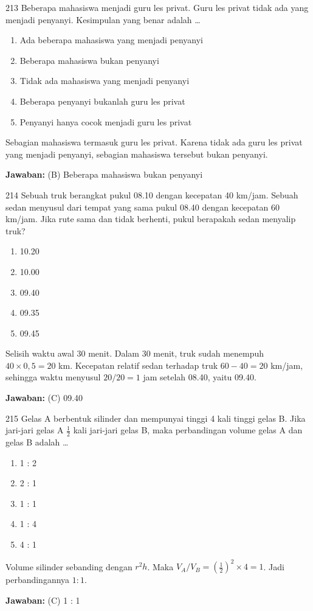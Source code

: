 \documentclass[11pt]{article}
\newenvironment{pil}{\begin{enumerate}[label=(\Alph*),leftmargin=*,itemsep=1pt,topsep=3pt]}{\end{enumerate}}
\newcommand{\jw}[1]{\par\smallskip\begin{jawbox}\textbf{Jawaban:} #1\end{jawbox}}
\begin{document}
\begin{soalbox}{2}{13}
Beberapa mahasiswa menjadi guru les privat. Guru les privat tidak ada yang menjadi penyanyi. Kesimpulan yang benar adalah \ldots
\begin{pil}\item Ada beberapa mahasiswa yang menjadi penyanyi \item Beberapa mahasiswa bukan penyanyi \item Tidak ada mahasiswa yang menjadi penyanyi \item Beberapa penyanyi bukanlah guru les privat \item Penyanyi hanya cocok menjadi guru les privat\end{pil}
\end{soalbox}
\begin{pembox}
Sebagian mahasiswa termasuk guru les privat. Karena tidak ada guru les privat yang menjadi penyanyi, sebagian mahasiswa tersebut bukan penyanyi.
\jw{(B) Beberapa mahasiswa bukan penyanyi}
\end{pembox}

\begin{soalbox}{2}{14}
Sebuah truk berangkat pukul 08.10 dengan kecepatan 40 km/jam. Sebuah sedan menyusul dari tempat yang sama pukul 08.40 dengan kecepatan 60 km/jam. Jika rute sama dan tidak berhenti, pukul berapakah sedan menyalip truk?
\begin{pil}\item 10.20 \item 10.00 \item 09.40 \item 09.35 \item 09.45\end{pil}
\end{soalbox}
\begin{pembox}
Selisih waktu awal 30 menit. Dalam 30 menit, truk sudah menempuh $40\times0{,}5=20$ km. Kecepatan relatif sedan terhadap truk $60-40=20$ km/jam, sehingga waktu menyusul $20/20=1$ jam setelah 08.40, yaitu 09.40.
\jw{(C) 09.40}
\end{pembox}

\begin{soalbox}{2}{15}
Gelas A berbentuk silinder dan mempunyai tinggi 4 kali tinggi gelas B. Jika jari-jari gelas A $\frac{1}{2}$ kali jari-jari gelas B, maka perbandingan volume gelas A dan gelas B adalah \ldots
\begin{pil}\item 1 : 2 \item 2 : 1 \item 1 : 1 \item 1 : 4 \item 4 : 1\end{pil}
\end{soalbox}
\begin{pembox}
Volume silinder sebanding dengan $r^2h$. Maka $V_A/V_B=\left(\frac{1}{2}\right)^2\times4=1$. Jadi perbandingannya $1:1$.
\jw{(C) 1 : 1}
\end{pembox}
\end{document}
